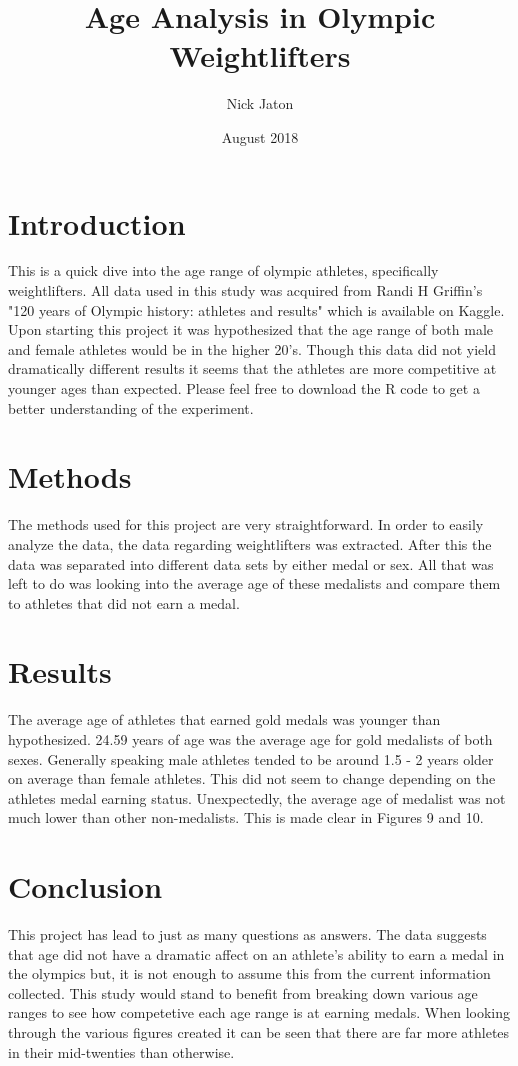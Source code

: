 \documentclass{article}
\title{Age Analysis in Olympic Weightlifters}
\author{Nick Jaton}
\date{August 2018}
\begin{document}
\begin{titlepage}
\maketitle
\end{titlepage}

\section{Introduction}
	This is a quick dive into the age range of olympic athletes, specifically weightlifters. All data used in this study was acquired from Randi H Griffin's "120 years of Olympic history: athletes and results" which is available on Kaggle. Upon starting this project it was hypothesized that the age range of both male and female athletes would be in the higher 20's. Though this data did not yield dramatically different results it seems that the athletes are more competitive at younger ages than expected. Please feel free to download the R code to get a better understanding of the experiment.

\section{Methods}
	The methods used for this project are very straightforward. In order to easily analyze the data, the data regarding weightlifters was extracted. After this the data was separated into different data sets by either medal or sex. All that was left to do was looking into the average age of these medalists and compare them to athletes that did not earn a medal.

\section{Results}
	The average age of athletes that earned gold medals was younger than hypothesized. 24.59 years of age was the average age for gold medalists of both sexes. Generally speaking male athletes tended to be around 1.5 - 2 years older on average than female athletes. This did not seem to change depending on the athletes medal earning status. Unexpectedly, the average age of medalist was not much lower than other non-medalists. This is made clear in Figures 9 and 10.

\section{Conclusion}
	This project has lead to just as many questions as answers. The data suggests that age did not have a dramatic affect on an athlete's ability to earn a medal in the olympics but, it is not enough to assume this from the current information collected. This study would stand to benefit from breaking down various age ranges to see how competetive each age range is at earning medals. When looking through the various figures created it can be seen that there are far more athletes in their mid-twenties than otherwise.  
\end{document}
